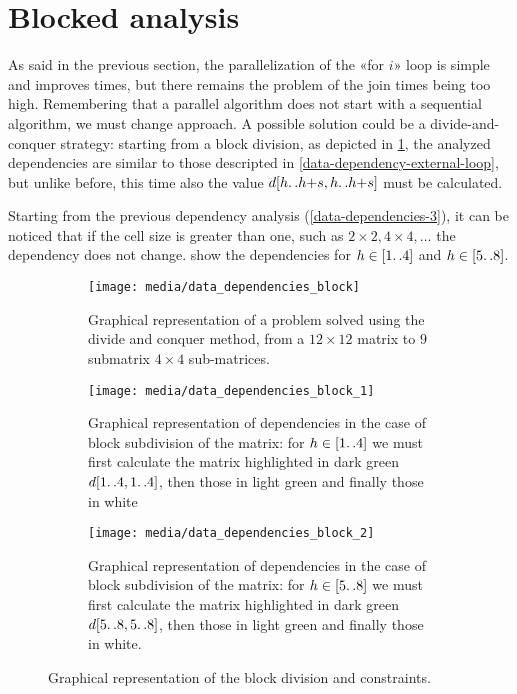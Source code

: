 \section{Blocked analysis}\label{blocked_parallelization}

As said in the previous section, the parallelization of the «for \(i\)» loop is simple and improves times, but there remains the problem of the join times being too high. 
Remembering that a parallel algorithm does not start with a sequential algorithm, we must change approach.
A possible solution could be a divide-and-conquer strategy: starting from a block division, as depicted in \cref{submatrix}, the analyzed dependencies are similar to those descripted in \cref{data-dependency-external-loop}, but unlike before, this time also the value \(d[h{\mathinner {\ldotp \ldotp}}h{+}s,h{\mathinner {\ldotp \ldotp}}h{+}s]\) must be calculated.

Starting from the previous dependency analysis (\cref{data-dependencies-3}), it can be noticed that if the cell size is greater than one, such as  \(  2 \times 2,  4 \times 4, \dots\) the dependency does not change.
 show the dependencies for \(h \in [1{\mathinner {\ldotp \ldotp}}4]\) and \(h \in [5{\mathinner {\ldotp \ldotp}}8]\).

\begin{figure}[htbp]
    \centering
    \begin{subfigure}[t]{0.3\textwidth}
        \texttt{[image: media/data\_dependencies\_block]}
        \caption{Graphical representation of a problem solved using the divide and conquer method, from a \(12\times 12\) matrix to \(9\) submatrix \(4\times 4\) sub-matrices.}
        \label{submatrix}
    \end{subfigure}
    \hfill
    \begin{subfigure}[t]{0.3\textwidth}
        \texttt{[image: media/data\_dependencies\_block\_1]}
        \caption{Graphical representation of dependencies in the case of block subdivision of the matrix: for \(h \in [1{\mathinner {\ldotp \ldotp}}4]\) we must first calculate the matrix highlighted in dark green \(d[1{\mathinner {\ldotp \ldotp}}4,1{\mathinner {\ldotp \ldotp}}4]\), then those in light green and finally those in white}
        \label{data-dependencies-block-1}
    \end{subfigure}
    \hfill
    \begin{subfigure}[t]{0.3\textwidth}
        \texttt{[image: media/data\_dependencies\_block\_2]}
        \caption{Graphical representation of dependencies in the case of block subdivision of the matrix: for \(h \in [5{\mathinner {\ldotp \ldotp}}8]\) we must first calculate the matrix highlighted in dark green \(d[5{\mathinner {\ldotp \ldotp}}8,5{\mathinner {\ldotp \ldotp}}8]\), then those in light green and finally those in white.}
        \label{data-dependencies-block-2}
    \end{subfigure}
    \caption{Graphical representation of the block division and constraints.}
    \label{data-representation-of-the-block-division-and-constraints}
\end{figure}

